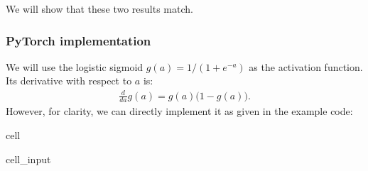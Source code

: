 \documentclass[letterpaper,10pt,english]{jupyterBook}
\begin{document}
\sphinxAtStartPar
We will show that these two results match.


\subsubsection{PyTorch implementation}
\label{\detokenize{04:pytorch-implementation}}
\sphinxAtStartPar
{}

\sphinxAtStartPar
We will use the logistic sigmoid \(g(a) = 1 / (1 + e^{-a})\) as the activation function. Its derivative with respect to \(a\) is:
\begin{equation*}
\begin{split}\frac{d}{da} g(a) = g(a) \bigl(1 - g(a)\bigr).\end{split}
\end{equation*}
\sphinxAtStartPar
However, for clarity, we can directly implement it as given in the example code:

\begin{sphinxuseclass}{cell}\begin{sphinxVerbatimInput}

\begin{sphinxuseclass}{cell_input}
\begin{sphinxVerbatim}[commandchars=\\\{\}]
         

         
\end{sphinxVerbatim}

\end{sphinxuseclass}\end{sphinxVerbatimInput}

\end{sphinxuseclass}
\sphinxAtStartPar
{}
\end{document}

